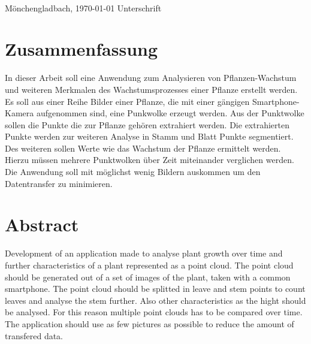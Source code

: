 \documentclass[12pt,titlepage, twoside]{article}
\begin{document}
\vspace{8ex}
\begin{tabbing}
\underline{\hspace{14em}} \hspace{3em}\= \underline{\hspace{14em}} \\
Mönchengladbach, \today \> Unterschrift
\end{tabbing}

\newpage
\section*{Zusammenfassung}
In dieser Arbeit soll eine Anwendung zum Analysieren von Pflanzen-Wachstum und weiteren Merkmalen des Wachstumsprozesses einer Pflanze erstellt werden. 
Es soll aus einer Reihe Bilder einer Pflanze, die mit einer gängigen Smartphone-Kamera aufgenommen sind, eine Punkwolke erzeugt werden. 
Aus der Punktwolke sollen die Punkte die zur Pflanze gehören extrahiert werden. 
Die extrahierten Punkte werden zur weiteren Analyse in Stamm und Blatt Punkte segmentiert.
Des weiteren sollen Werte wie das Wachstum der Pflanze ermittelt werden. Hierzu müssen mehrere Punktwolken über Zeit miteinander verglichen werden.
Die Anwendung soll mit möglichst wenig Bildern auskommen um den Datentransfer zu minimieren.

\setcounter{page}{1}
\section*{Abstract}
Development of an application made to analyse plant growth over time and further characteristics of a plant represented as a point cloud. The point cloud should be generated out of a set of images of the plant, taken with a common smartphone.
The point cloud should be splitted in leave and stem points to count leaves and analyse the stem further. 
Also other characteristics as the hight should be analysed. For this reason multiple point clouds has to be compared over time.
The application should use as few pictures as possible to reduce the amount of transfered data.

\newpage
\end{document}

